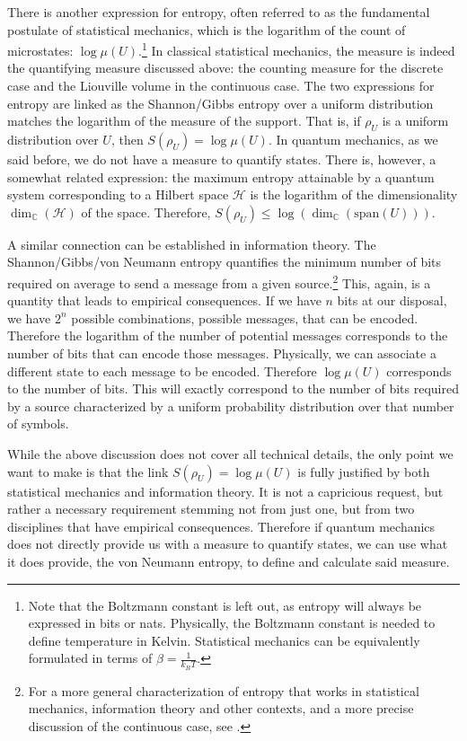 \documentclass[entropy,article,submit,pdftex,moreauthors]{Definitions/mdpi}
\begin{document}
There is another expression for entropy, often referred to as the fundamental postulate of statistical mechanics, \cite{Peliti2011} which is the logarithm of the count of microstates: $\log \mu(U)$.\footnote{Note that the Boltzmann constant is left out, as entropy will always be expressed in bits or nats. Physically, the Boltzmann constant is needed to define temperature in Kelvin. Statistical mechanics can be equivalently formulated in terms of $\beta = \frac{1}{k_B T}$.\cite{chyla2011evolution}} In classical statistical mechanics, the measure is indeed the quantifying measure discussed above: the counting measure for the discrete case and the Liouville volume in the continuous case. The two expressions for entropy are linked as the Shannon/Gibbs entropy over a uniform distribution matches the logarithm of the measure of the support. That is, if $\rho_U$ is a uniform distribution over $U$, then $S(\rho_U) = \log \mu(U)$. In quantum mechanics, as we said before, we do not have a measure to quantify states. There is, however, a somewhat related expression: the maximum entropy attainable by a quantum system corresponding to a Hilbert space $\mathcal{H}$ is the logarithm of the dimensionality $\dim_{\mathbb{C}}(\mathcal{H})$ of the space. Therefore, $ S(\rho_U) \leq \log (\dim_{\mathbb{C}}(\text{span}(U)))$.

A similar connection can be established in information theory. The Shannon/Gibbs/von Neumann entropy quantifies the minimum number of bits required on average to send a message from a given source.\footnote{For a more general characterization of entropy that works in statistical mechanics, information theory and other contexts, and a more precise discussion of the continuous case, see \cite{aop-phys-variability}.} This, again, is a quantity that leads to empirical consequences. If we have $n$ bits at our disposal, we have $2^n$ possible combinations, possible messages, that can be encoded. Therefore the logarithm of the number of potential messages corresponds to the number of bits that can encode those messages. Physically, we can associate a different state to each message to be encoded. Therefore $\log \mu(U)$ corresponds to the number of bits. This will exactly correspond to the number of bits required by a source characterized by a uniform probability distribution over that number of symbols.

While the above discussion does not cover all technical details, the only point we want to make is that the link $S(\rho_U) = \log \mu(U)$ is fully justified by both statistical mechanics and information theory. It is not a capricious request, but rather a necessary requirement stemming not from just one, but from two disciplines that have empirical consequences. Therefore if quantum mechanics does not directly provide us with a measure to quantify states, we can use what it does provide, the von Neumann entropy, to define and calculate said measure.
\end{document}
